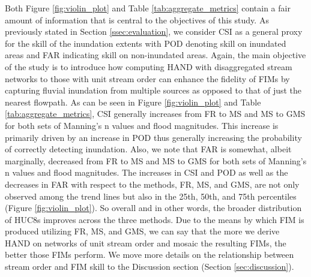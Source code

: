 Both Figure \ref{fig:violin_plot} and Table \ref{tab:aggregate_metrics} contain a fair amount of information that is central to the objectives of this study.
As previously stated in Section \ref{ssec:evaluation}, we consider CSI as a general proxy for the skill of the inundation extents with POD denoting skill on inundated areas and FAR indicating skill on non-inundated areas.
Again, the main objective of the study is to introduce how computing HAND with disaggregated stream networks to those with unit stream order can enhance the fidelity of FIMs by capturing fluvial inundation from multiple sources as opposed to that of just the nearest flowpath.
As can be seen in Figure \ref{fig:violin_plot} and Table \ref{tab:aggregate_metrics}, CSI generally increases from FR to MS and MS to GMS for both sets of Manning's n values and flood magnitudes.
This increase is primarily driven by an increase in POD thus generally increasing the probability of correctly detecting inundation.
Also, we note that FAR is somewhat, albeit marginally, decreased from FR to MS and MS to GMS for both sets of Manning's n values and flood magnitudes.
The increases in CSI and POD as well as the decreases in FAR with respect to the methods, FR, MS, and GMS, are not only observed among the trend lines but also in the 25th, 50th, and 75th percentiles (Figure \ref{fig:violin_plot}).
So overall and in other words, the broader distribution of HUC8s improves across the three methods.
Due to the means by which FIM is produced utilizing FR, MS, and GMS, we can say that the more we derive HAND on networks of unit stream order and mosaic the resulting FIMs, the better those FIMs perform.
We move more details on the relationship between stream order and FIM skill to the Discussion section (Section \ref{sec:discussion}).

